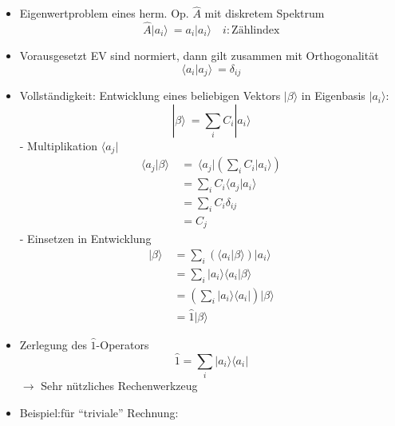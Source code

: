 \documentclass[10pt,article,colorback,accentcolor=tud9d]{scrartcl}
\begin{document}
\begin{itemize}
  \item Eigenwertproblem eines herm. Op. $\hat{A}$ mit diskretem Spektrum
    \begin{equation}
    \hat{A}|a_i\rangle  \ = a_i|a_i\rangle  \quad i:\text{Zählindex}
    \end{equation}
  \item Vorausgesetzt EV sind normiert, dann gilt zusammen mit Orthogonalität 
    \begin{equation}
    \langle a_i|a_j\rangle  \ = \delta_{ij}
    \end{equation}
  \item Vollständigkeit: Entwicklung eines beliebigen Vektors $|\beta\rangle $ in Eigenbasis $|a_i\rangle $:
    \begin{equation}
    |\beta\rangle  \ = \sum_i C_i |a_i \rangle 
    \end{equation}
    - Multiplikation $\langle a_j|$
      \begin{equation}
      \begin{aligned}
      \langle a_j|\beta\rangle  \ &= \ \langle a_j|\left(\sum_i C_i|a_i\rangle \right)\\
      &=\sum_iC_i\langle a_j|a_i\rangle \\
      &=\sum_iC_i \delta_{ij}\\
      &=C_j
      \end{aligned}
      \end{equation}
    - Einsetzen in Entwicklung
    \begin{equation}
    \begin{aligned}
      |\beta\rangle  \ &= \sum_i\left(\langle a_i|\beta\rangle \right) |a_i\rangle \\
      &=\sum_i|a_i\rangle \langle a_i|\beta\rangle \\
      &=\left(\sum_i|a_i\rangle \langle a_i|\right)|\beta\rangle \\
      &=\hat{1}|\beta\rangle 
    \end{aligned}
    \end{equation}
  \item Zerlegung des $\hat{1}$-Operators
    \begin{equation}
    \hat{1}= \sum_i |a_i\rangle \langle a_i|
    \end{equation}
    $\rightarrow$ Sehr nützliches Rechenwerkzeug
  \item Beispiel:für "`triviale"' Rechnung:
    \begin{equation}

\end{equation}
\end{itemize}
\end{document}
